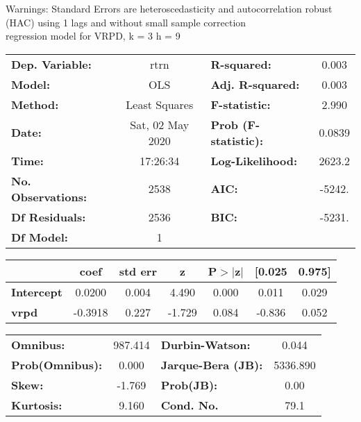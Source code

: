 Warnings: \newline
 [1] Standard Errors are heteroscedasticity and autocorrelation robust (HAC) using 1 lags and without small sample correction\\ 

regression model for VRPD, k = 3 h = 9\begin{center}
\begin{tabular}{lclc}
\toprule
\textbf{Dep. Variable:}    &       rtrn       & \textbf{  R-squared:         } &     0.003   \\
\textbf{Model:}            &       OLS        & \textbf{  Adj. R-squared:    } &     0.003   \\
\textbf{Method:}           &  Least Squares   & \textbf{  F-statistic:       } &     2.990   \\
\textbf{Date:}             & Sat, 02 May 2020 & \textbf{  Prob (F-statistic):} &   0.0839    \\
\textbf{Time:}             &     17:26:34     & \textbf{  Log-Likelihood:    } &    2623.2   \\
\textbf{No. Observations:} &        2538      & \textbf{  AIC:               } &    -5242.   \\
\textbf{Df Residuals:}     &        2536      & \textbf{  BIC:               } &    -5231.   \\
\textbf{Df Model:}         &           1      & \textbf{                     } &             \\
\bottomrule
\end{tabular}
\begin{tabular}{lcccccc}
                   & \textbf{coef} & \textbf{std err} & \textbf{z} & \textbf{P$> |$z$|$} & \textbf{[0.025} & \textbf{0.975]}  \\
\midrule
\textbf{Intercept} &       0.0200  &        0.004     &     4.490  &         0.000        &        0.011    &        0.029     \\
\textbf{vrpd}      &      -0.3918  &        0.227     &    -1.729  &         0.084        &       -0.836    &        0.052     \\
\bottomrule
\end{tabular}
\begin{tabular}{lclc}
\textbf{Omnibus:}       & 987.414 & \textbf{  Durbin-Watson:     } &    0.044  \\
\textbf{Prob(Omnibus):} &   0.000 & \textbf{  Jarque-Bera (JB):  } & 5336.890  \\
\textbf{Skew:}          &  -1.769 & \textbf{  Prob(JB):          } &     0.00  \\
\textbf{Kurtosis:}      &   9.160 & \textbf{  Cond. No.          } &     79.1  \\
\bottomrule
\end{tabular}
\end{center}


